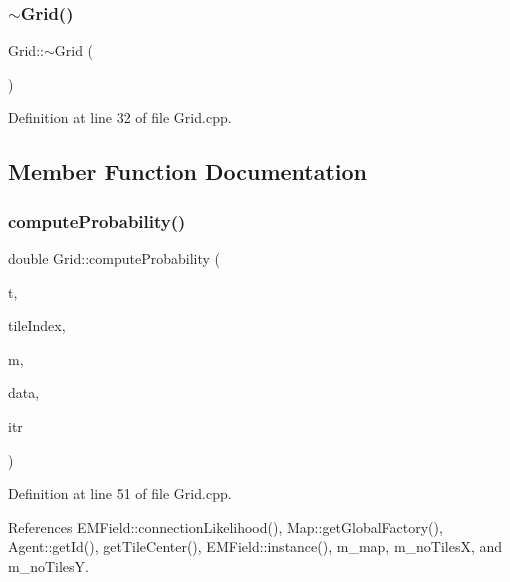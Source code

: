 \mbox{\label{class_grid_a3661d0a7f998caaaf8627d7a67072116}} 
\subsubsection{$\sim$Grid()}
{\footnotesize\ttfamily Grid\+::$\sim$\+Grid (\begin{DoxyParamCaption}{ }\end{DoxyParamCaption})\hspace{0.3cm}{\ttfamily [virtual]}}



Definition at line 32 of file Grid.\+cpp.



\subsection{Member Function Documentation}
\mbox{\label{class_grid_addfce41a6f3e3100f10dd2a0577fc35e}} 
\subsubsection{computeProbability()}
{\footnotesize\ttfamily double Grid\+::compute\+Probability (\begin{DoxyParamCaption}\item[{unsigned long}]{t,  }\item[{unsigned long}]{tile\+Index,  }\item[{\textbf{ Mobile\+Phone} $\ast$}]{m,  }\item[{vector$<$ \textbf{ Antenna\+Info} $>$ \&}]{data,  }\item[{std\+::pair$<$ \textbf{ um\+\_\+iterator}, \textbf{ um\+\_\+iterator} $>$}]{itr }\end{DoxyParamCaption})}



Definition at line 51 of file Grid.\+cpp.



References E\+M\+Field\+::connection\+Likelihood(), Map\+::get\+Global\+Factory(), Agent\+::get\+Id(), get\+Tile\+Center(), E\+M\+Field\+::instance(), m\+\_\+map, m\+\_\+no\+TilesX, and m\+\_\+no\+TilesY.

\mbox{\label{class_grid_a25f914f4b6a8b4cb8af934a37b1e2a04}} 
